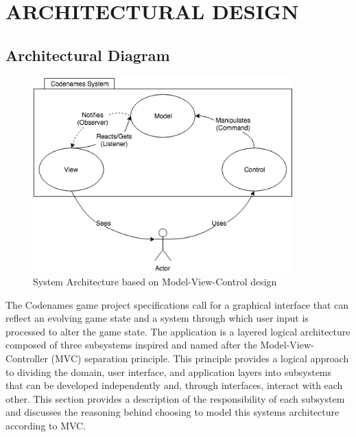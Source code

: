 \section{ARCHITECTURAL DESIGN}



\subsection{Architectural Diagram}

\begin{figure}[H]
\centering
\includegraphics[width=10cm]{Source/MVC.png}
\caption{System Architecture based on Model-View-Control design}
\label{View}
\end{figure}



The Codenames game project specifications call for a graphical interface that can reflect an evolving game state and a system through which user input is processed to alter the game state. The application is a layered logical architecture composed of three subsystems inspired and named after the Model-View-Controller (MVC) separation principle. This principle provides a logical approach to dividing the domain, user interface, and application layers into subsystems that can be developed independently and, through interfaces, interact with each other. This section provides a description of the responsibility of each subsystem and discusses the reasoning behind choosing to model this systems architecture according to MVC. \\

